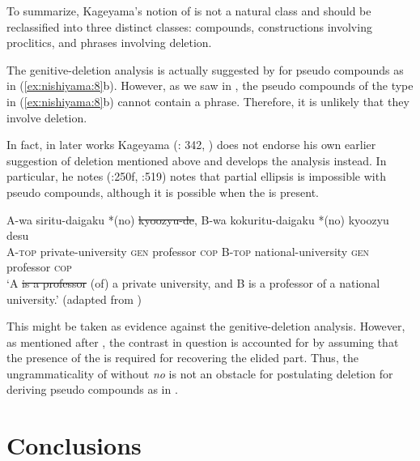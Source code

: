\documentclass[output=paper]{LSP/langsci}
\begin{document}
\begin{exe}
To summarize, Kageyama’s notion of  is not a natural class and should be reclassified into three distinct classes:  compounds, constructions involving proclitics, and phrases involving  deletion.

The genitive-deletion analysis is actually suggested by \citet[163, n. 7]{KageyamaShibatani1989} for  pseudo compounds as in (\ref{ex:nishiyama:8}b). However, as we saw in , the  pseudo compounds of the type in (\ref{ex:nishiyama:8}b) cannot contain a phrase. Therefore, it is unlikely that they involve  deletion.

In fact, in later works Kageyama (\citeyear{Kageyama1993}: 342, \citeyear{Kageyama2001,Kageyama2009}) does not endorse his own earlier suggestion of  deletion mentioned above and develops the  analysis instead. In particular, he notes (\citeyear{Kageyama2001}:250f, \citet{Kageyama2009}:519) notes that partial ellipsis is impossible with pseudo compounds, although it is possible when the  is present.

\ea\label{ex:nishiyama:46}
 \gll A-wa siritu-daigaku  *(no) \st{kyoozyu-de},  B-wa kokuritu-daigaku *(no) kyoozyu desu\\
  A-\textsc{top} private-university \textsc{gen} {professor \textsc{cop}}  B-\textsc{top} national-university \textsc{gen} professor \textsc{cop}\\
\glt   ‘A \st{is a professor} (of) a private university, and B is a professor of a national university.’
(adapted from \citealt[519]{Kageyama2009})
\z

This might be taken as evidence against the genitive-deletion analysis. However, as mentioned after , the contrast in question is accounted for by assuming that the presence of the  is required for recovering the elided part. Thus, the ungrammaticality of  without \textit{no} is not an obstacle for postulating  deletion for deriving  pseudo compounds as in .

\section{Conclusions}\label{sec:nishiyama:6}


\end{exe}
\end{document}
